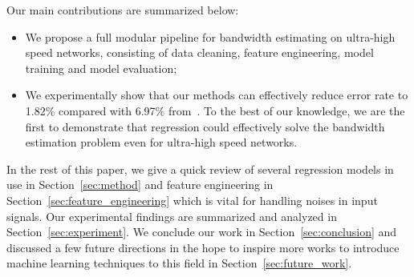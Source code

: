 Our main contributions are summarized below:
\begin{itemize}
\item We propose a full modular pipeline for bandwidth estimating on ultra-high
  speed networks, consisting of data cleaning, feature engineering, model
  training and model evaluation;
\item We experimentally show that our methods can effectively reduce error rate
  to 1.82\% compared with 6.97\% from~\cite{Yin2014}. To the best of our
  knowledge, we are the first to demonstrate that regression could effectively
  solve the bandwidth estimation problem even for ultra-high speed networks.
\end{itemize}

In the rest of this paper, we give a quick review of several regression models
in use in Section~\ref{sec:method} and feature engineering in
Section~\ref{sec:feature_engineering} which is vital for handling noises in
input signals. Our experimental findings are summarized and analyzed in
Section~\ref{sec:experiment}. We conclude our work in
Section~\ref{sec:conclusion} and discussed a few future directions in the hope
to inspire more works to introduce machine learning techniques to this field in
Section~\ref{sec:future_work}.
